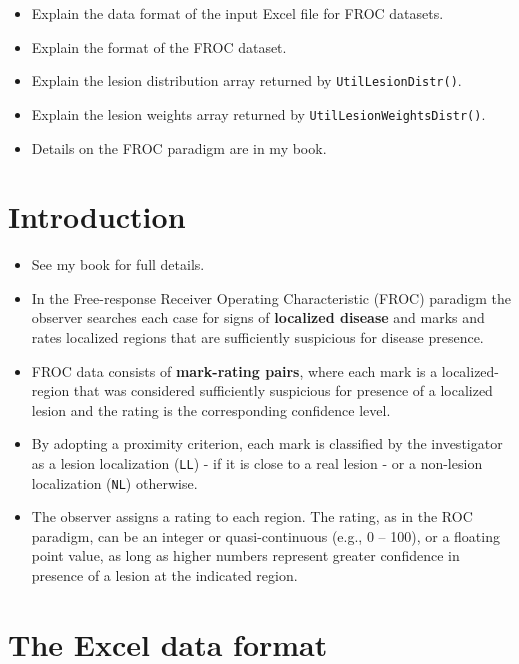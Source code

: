 \documentclass[
]{book}
\providecommand{\tightlist}{%
  \setlength{\itemsep}{0pt}\setlength{\parskip}{0pt}}
\begin{document}
\begin{itemize}
\tightlist
\item
  Explain the data format of the input Excel file for FROC datasets.
\item
  Explain the format of the FROC dataset.
\item
  Explain the lesion distribution array returned by \texttt{UtilLesionDistr()}.
\item
  Explain the lesion weights array returned by \texttt{UtilLesionWeightsDistr()}.
\item
  Details on the FROC paradigm are in my book.
\end{itemize}

\hypertarget{introduction-1}{%
\section{Introduction}\label{introduction-1}}

\begin{itemize}
\tightlist
\item
  See my book \citet{RN2680} for full details.
\item
  In the Free-response Receiver Operating Characteristic (FROC) paradigm \citep{RN761} the observer searches each case for signs of \textbf{localized disease} and marks and rates localized regions that are sufficiently suspicious for disease presence.
\item
  FROC data consists of \textbf{mark-rating pairs}, where each mark is a localized-region that was considered sufficiently suspicious for presence of a localized lesion and the rating is the corresponding confidence level.
\item
  By adopting a proximity criterion, each mark is classified by the investigator as a lesion localization (\texttt{LL}) - if it is close to a real lesion - or a non-lesion localization (\texttt{NL}) otherwise.
\item
  The observer assigns a rating to each region. The rating, as in the ROC paradigm, can be an integer or quasi-continuous (e.g., 0 -- 100), or a floating point value, as long as higher numbers represent greater confidence in presence of a lesion at the indicated region.
\end{itemize}

\hypertarget{the-excel-data-format-1}{%
\section{The Excel data format}\label{the-excel-data-format-1}}
\end{document}
